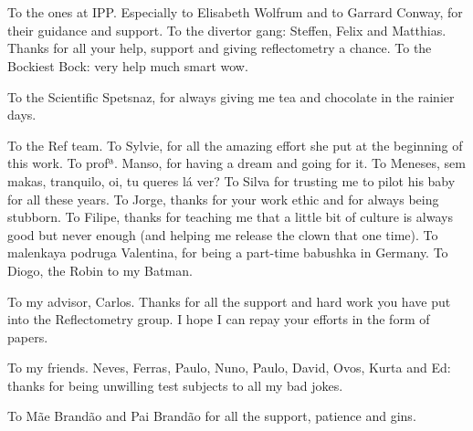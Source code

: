 
\section*{\acknowledgments}


To the ones at IPP. Especially to Elisabeth Wolfrum and to Garrard Conway, for their guidance and support. To the divertor gang: Steffen, Felix and Matthias. Thanks for all your help, support and giving reflectometry a chance. To the Bockiest Bock: very help much smart wow.

To the Scientific Spetsnaz, for always giving me tea and chocolate in the rainier days.

To the Ref team. To Sylvie, for all the amazing effort she put at the beginning of this work. To profª. Manso, for having a dream and going for it. To Meneses, sem makas, tranquilo, oi, tu queres lá ver? To Silva for trusting me to pilot his baby for all these years. To Jorge, thanks for your work ethic and for always being stubborn. To Filipe, thanks for teaching me that a little bit of culture is always good but never enough (and helping me release the clown that one time). To malenkaya podruga Valentina, for being a part-time babushka in Germany. To Diogo, the Robin to my Batman.

To my advisor, Carlos. Thanks for all the support and hard work you have put into the Reflectometry group. I hope I can repay your efforts in the form of papers. 

To my friends. Neves, Ferras, Paulo, Nuno, Paulo, David, Ovos, Kurta and Ed: thanks for being unwilling test subjects to all my bad jokes.

To Mãe Brandão and Pai Brandão for all the support, patience and gins.

